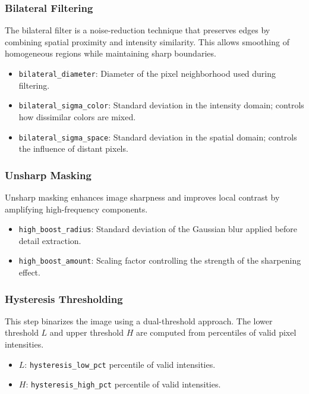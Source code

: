 \documentclass[english,12pt,a4paper]{article}
\begin{document}
	\subsubsection{Bilateral Filtering}
	
	The bilateral filter is a noise-reduction technique that preserves edges by combining spatial proximity and intensity similarity. This allows smoothing of homogeneous regions while maintaining sharp boundaries.
	
	\begin{itemize}
		\item \texttt{bilateral\_diameter}: Diameter of the pixel neighborhood used during filtering.
		\item \texttt{bilateral\_sigma\_color}: Standard deviation in the intensity domain; controls how dissimilar colors are mixed.
		\item \texttt{bilateral\_sigma\_space}: Standard deviation in the spatial domain; controls the influence of distant pixels.
	\end{itemize}
	
	\subsubsection{Unsharp Masking}
	
	Unsharp masking enhances image sharpness and improves local contrast by amplifying high-frequency components.
	
	\begin{itemize}
		\item \texttt{high\_boost\_radius}: Standard deviation of the Gaussian blur applied before detail extraction.
		\item \texttt{high\_boost\_amount}: Scaling factor controlling the strength of the sharpening effect.
	\end{itemize}
	
	\subsubsection{Hysteresis Thresholding}
	
	This step binarizes the image using a dual-threshold approach. The lower threshold $L$ and upper threshold $H$ are computed from percentiles of valid pixel intensities.
	
	\begin{itemize}
		\item $L$: \texttt{hysteresis\_low\_pct} percentile of valid intensities.
		\item $H$: \texttt{hysteresis\_high\_pct} percentile of valid intensities.
	\end{itemize}
	
\end{document}
